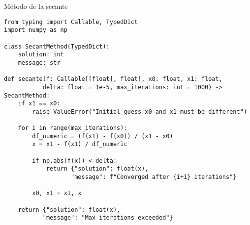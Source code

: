 \begin{frame}[fragile]{Método de la secante}

\begin{lstlisting}
from typing import Callable, TypedDict
import numpy as np

class SecantMethod(TypedDict):
    solution: int
    message: str

def secante(f: Callable[[float], float], x0: float, x1: float,
           delta: float = 1e-5, max_iterations: int = 1000) -> SecantMethod:
    if x1 == x0:
        raise ValueError("Initial guess x0 and x1 must be different")
    
    for i in range(max_iterations):
        df_numeric = (f(x1) - f(x0)) / (x1 - x0)
        x = x1 - f(x1) / df_numeric
        
        if np.abs(f(x)) < delta:
            return {"solution": float(x), 
                   "message": f"Converged after {i+1} iterations"}
        
        x0, x1 = x1, x
    
    return {"solution": float(x), 
           "message": "Max iterations exceeded"}
\end{lstlisting}
\end{frame}